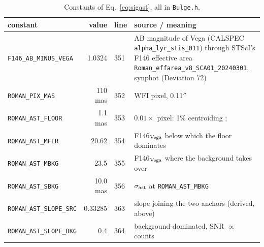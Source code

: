 \documentclass[english,10pt,a4paper]{article}
\newcommand{\code}[1]{\texttt{#1}}
\begin{document}
\begin{table}[h]
\centering
\caption{Constants of Eq.~\eqref{eq:sigast}, all in \code{Bulge.h}.}
\label{tab:const}
\small
\begin{tabularx}{\textwidth}{@{}l r l X@{}}
\toprule
constant & value & line & source / meaning \\
\midrule
\code{F146\_AB\_MINUS\_VEGA}  & 1.0324     & 351 & AB magnitude of Vega (CALSPEC \code{alpha\_lyr\_stis\_011}) through STScI's F146 effective area \code{Roman\_effarea\_v8\_SCA01\_20240301}, synphot (Deviation 72) \\
\code{ROMAN\_PIX\_MAS}        & 110 mas    & 352 & WFI pixel, 0.11$''$ \citep{Lam2026BHbinaries} \\
\code{ROMAN\_AST\_FLOOR}      & 1.1 mas    & 353 & $0.01\times$ pixel: 1\% centroiding \citep[§1.1]{Sanderson2019WFIRSTastrometry}; \citep[Fig.~5]{Lam2026BHbinaries} \\
\code{ROMAN\_AST\_MFLR}       & 20.62      & 354 & F146$_{\rm Vega}$ below which the floor dominates \citep{Lam2026BHbinaries} \\
\code{ROMAN\_AST\_MBKG}       & 23.5       & 355 & F146$_{\rm Vega}$ where the background takes over \citep{Lam2026BHbinaries} \\
\code{ROMAN\_AST\_SBKG}       & 10.0 mas   & 356 & $\sigma_{\rm ast}$ at \code{ROMAN\_AST\_MBKG} \citep{Lam2026BHbinaries} \\
\code{ROMAN\_AST\_SLOPE\_SRC} & 0.33285    & 363 & slope joining the two anchors (derived, above) \\
\code{ROMAN\_AST\_SLOPE\_BKG} & 0.4        & 364 & background-dominated, SNR $\propto$ counts \\
\bottomrule
\end{tabularx}
\end{table}
\end{document}
